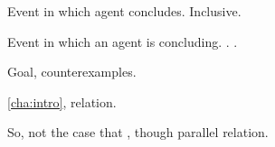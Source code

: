 \begin{note}
  Event in which agent concludes.
  Inclusive.
\end{note}

\begin{note}
  Event in which an agent is concluding.
  \assuPP{}.
  \pevent{}.
\end{note}

\begin{note}
  Goal, counterexamples.

  \autoref{cha:intro}, relation.

  So, not the case that \evalN{}, though parallel relation.
\end{note}







